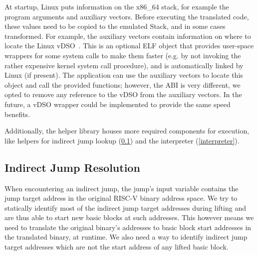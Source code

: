 \documentclass[course=eragp]{aspdoc}
\begin{document}
At startup, Linux puts information on the x86\_64 stack, for example the program arguments and auxiliary vectors. %
Before executing the translated code, these values need to be copied to the emulated Stack, and in some cases transformed.
For example, the auxiliary vectors contain information on where to locate the Linux vDSO~\cite{man_vdso}.
This is an optional ELF object that provides user-space wrappers for some system calls to make them faster (e.g. by not
invoking the rather expensive kernel system call procedure), and is automatically linked by Linux (if present).
The application can use the auxiliary vectors to locate this object and call the provided functions; however,
the ABI is very different, we opted to remove any reference to the vDSO from the auxiliary vectors.
In the future, a vDSO wrapper could be implemented to provide the same speed benefits.

Additionally, the helper library houses more required components for execution, like helpers for indirect jump lookup
(\ref{ijump_resolution}) and the interpreter (\ref{interpreter}).


\subsection{Indirect Jump Resolution}\label{ijump_resolution}

When encountering an indirect jump, the jump's input variable contains the jump target address in the
original RISC-V binary address space. We try to statically identify most of the indirect jump target
addresses during lifting and are thus able to start new basic blocks at such addresses.
This however means we need to translate the original binary's addresses to basic block start
addresses in the translated binary, at runtime. We also need a way to identify
indirect jump target addresses which are not the start address of any lifted basic block.
\end{document}
